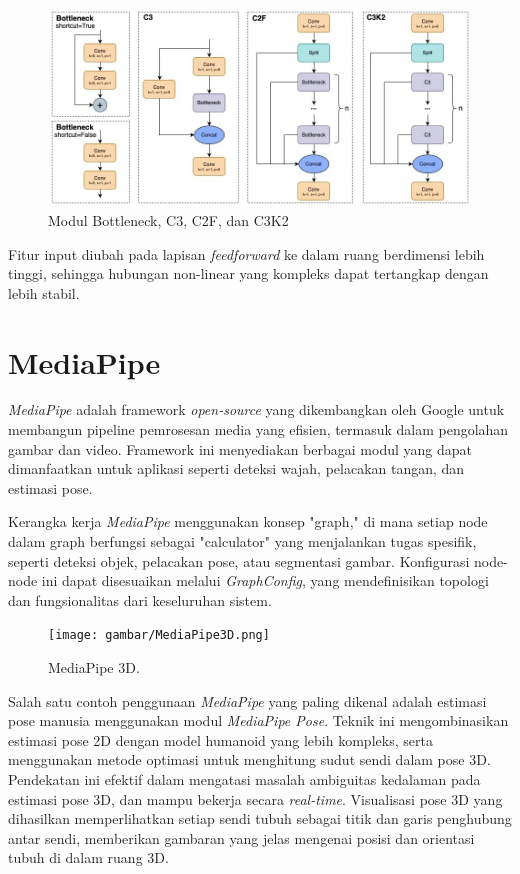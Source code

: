 \begin{figure}[H]
  \centering
  \includegraphics[scale=0.55]{gambar/C3k2.jpg}
  \caption{Modul Bottleneck, C3, C2F, dan C3K2}
  \label{fig:c3k2}
\end{figure}

Fitur input diubah pada lapisan \emph{feedforward} ke dalam ruang berdimensi lebih tinggi, sehingga hubungan non-linear yang kompleks dapat tertangkap dengan lebih stabil.

\section{MediaPipe}
\label{sec:MediaPipe}

\emph{MediaPipe} adalah framework \emph{open-source} yang dikembangkan oleh Google untuk membangun pipeline pemrosesan media yang efisien, termasuk dalam pengolahan gambar dan video. Framework ini menyediakan berbagai modul yang dapat dimanfaatkan untuk aplikasi seperti deteksi wajah, pelacakan tangan, dan estimasi pose.

Kerangka kerja \emph{MediaPipe} menggunakan konsep "graph," di mana setiap node dalam graph berfungsi sebagai "calculator" yang menjalankan tugas spesifik, seperti deteksi objek, pelacakan pose, atau segmentasi gambar. Konfigurasi node-node ini dapat disesuaikan melalui \emph{GraphConfig}, yang mendefinisikan topologi dan fungsionalitas dari keseluruhan sistem.

\begin{figure}[H]
  \centering
  \texttt{[image: gambar/MediaPipe3D.png]}
  \caption{MediaPipe 3D.}
  \label{fig:MediaPipe3D}
\end{figure}

Salah satu contoh penggunaan \emph{MediaPipe} yang paling dikenal adalah estimasi pose manusia menggunakan modul \emph{MediaPipe Pose}. Teknik ini mengombinasikan estimasi pose 2D dengan model humanoid yang lebih kompleks, serta menggunakan metode optimasi untuk menghitung sudut sendi dalam pose 3D. Pendekatan ini efektif dalam mengatasi masalah ambiguitas kedalaman pada estimasi pose 3D, dan mampu bekerja secara \emph{real-time}. Visualisasi pose 3D yang dihasilkan memperlihatkan setiap sendi tubuh sebagai titik dan garis penghubung antar sendi, memberikan gambaran yang jelas mengenai posisi dan orientasi tubuh di dalam ruang 3D.

